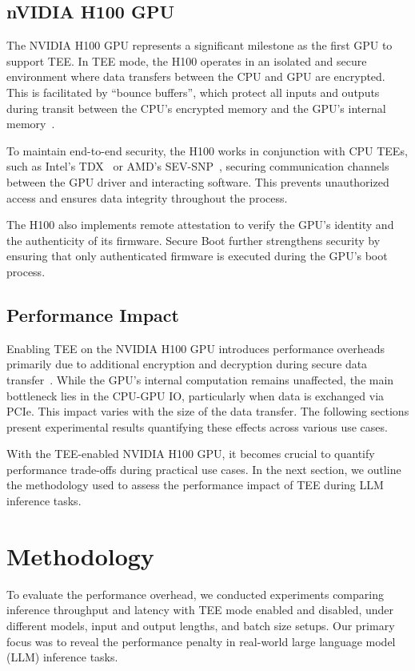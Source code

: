 \documentclass{article}
\begin{document}
\subsection{nVIDIA H100 GPU}

The NVIDIA H100 GPU represents a significant milestone as the first GPU to support TEE. In TEE mode, the H100 operates in an isolated and secure environment where data transfers between the CPU and GPU are encrypted. This is facilitated by ``bounce buffers'', which protect all inputs and outputs during transit between the CPU’s encrypted memory and the GPU’s internal memory~\cite{dhanuskodi2023creating}.

To maintain end-to-end security, the H100 works in conjunction with CPU TEEs, such as Intel’s TDX~\cite{TDX} or AMD’s SEV-SNP~\cite{SEV-SNP, sev2020strengthening}, securing communication channels between the GPU driver and interacting software. This prevents unauthorized access and ensures data integrity throughout the process.

The H100 also implements remote attestation to verify the GPU’s identity and the authenticity of its firmware. Secure Boot further strengthens security by ensuring that only authenticated firmware is executed during the GPU’s boot process.

\subsection{Performance Impact}

Enabling TEE on the NVIDIA H100 GPU introduces performance overheads primarily due to additional encryption and decryption during secure data transfer~\cite{mohan2024securing}. While the GPU’s internal computation remains unaffected, the main bottleneck lies in the CPU-GPU IO, particularly when data is exchanged via PCIe. This impact varies with the size of the data transfer. The following sections present experimental results quantifying these effects across various use cases.

With the TEE-enabled NVIDIA H100 GPU, it becomes crucial to quantify performance trade-offs during practical use cases. In the next section, we outline the methodology used to assess the performance impact of TEE during LLM inference tasks.

\section{Methodology}

To evaluate the performance overhead, we conducted experiments comparing inference throughput and latency with TEE mode enabled and disabled, under different models, input and output lengths, and batch size setups. Our primary focus was to reveal the performance penalty in real-world large language model (LLM) inference tasks.
\end{document}
